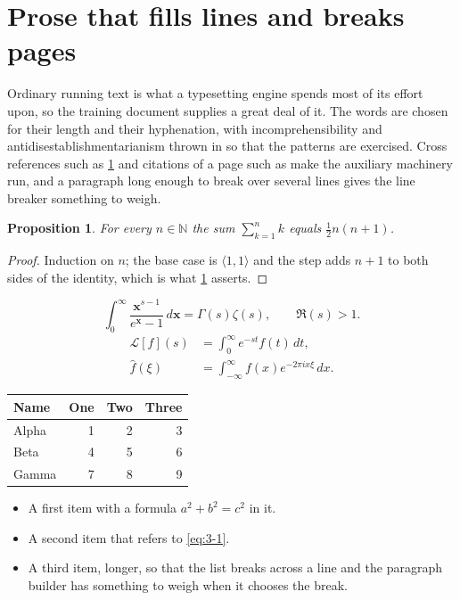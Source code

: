 \documentclass[11pt,a4paper]{report}
\theoremstyle{plain}
\newtheorem{proposition}{Proposition}[chapter]
\newcommand{\vecn}[1]{\mathbf{#1}}
\newcommand{\pairs}[2]{\langle #1,#2\rangle}
\begin{document}
\section{Prose that fills lines and breaks pages}
\label{sec:prose3-1}
Ordinary running text is what a typesetting engine spends most of its effort
upon, so the training document supplies a great deal of it. The words are
chosen for their length and their hyphenation, with incomprehensibility and
antidisestablishmentarianism thrown in so that the patterns are exercised.
Cross references such as \cref{sec:prose3-1} and citations of a page such
as \pageref{sec:prose3-1} make the auxiliary machinery run, and a
paragraph long enough to break over several lines gives the line breaker
something to weigh.
\begin{proposition}\label{prop:3-1}
For every $n\in\mathbb{N}$ the sum $\sum_{k=1}^{n}k$ equals
$\tfrac{1}{2}n(n+1)$.
\end{proposition}
\begin{proof}
Induction on $n$; the base case is $\pairs{1}{1}$ and the step adds $n+1$ to
both sides of the identity, which is what \cref{prop:3-1} asserts.
\end{proof}
\begin{equation}\label{eq:3-1}
  \int_{0}^{\infty}\frac{\vecn{x}^{s-1}}{e^{\vecn{x}}-1}\,d\vecn{x}
    = \Gamma(s)\zeta(s),\qquad \Re(s)>1 .
\end{equation}
\begin{align}
  \mathcal{L}[f](s) &= \int_{0}^{\infty} e^{-st} f(t)\,dt, \\
  \widehat{f}(\xi)  &= \int_{-\infty}^{\infty} f(x) e^{-2\pi i x\xi}\,dx .
\end{align}
\par\noindent\begin{center}
\begin{tabular}{lrrr}
\hline
Name & One & Two & Three \\
\hline
Alpha & 1 & 2 & 3 \\
Beta & 4 & 5 & 6 \\
Gamma & 7 & 8 & 9 \\
\hline
\end{tabular}
\end{center}
\begin{itemize}
  \item A first item with a formula $a^2+b^2=c^2$ in it.
  \item A second item that refers to \eqref{eq:3-1}.
  \item A third item, longer, so that the list breaks across a line and the
    paragraph builder has something to weigh when it chooses the break.
\end{itemize}
\end{document}
